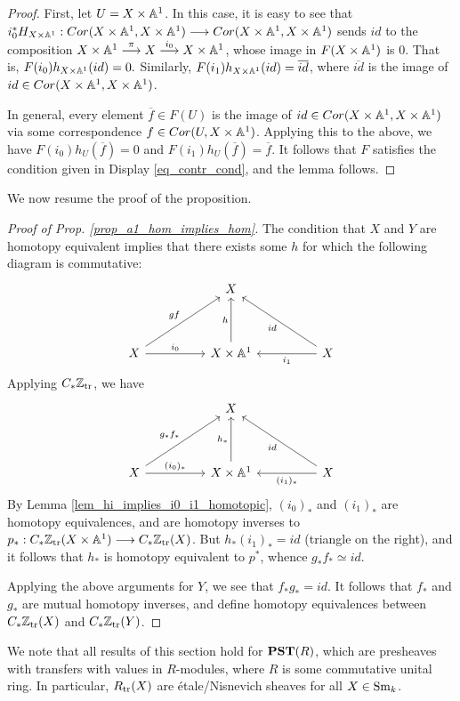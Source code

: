 \begin{proof}
First, let $U = X \times \mathbb{A}^1$. In this case, it is easy to see
that $i_0^* H_{X \times \mathbb{A}^1} : Cor(X \times \mathbb{A}^1, X \times \mathbb{A}^1) 
\longrightarrow Cor( X \times \mathbb{A}^1, X \times \mathbb{A}^1)$ sends $id$ to the 
composition $X \times \mathbb{A}^1 \stackrel{\pi}{\longrightarrow} X 
\stackrel{i_0}{\longrightarrow} X \times \mathbb{A}^1$, whose image in $F(X \times 
\mathbb{A}^1)$ is 0. That is, $F(i_0)h_{X \times \mathbb{A}^1}(id) = 0.$ 
Similarly, $F(i_1)h_{X \times \mathbb{A}^1}(id) = \overline{id}$, where
$\overline{id}$ is the image of $id \in Cor(X \times \mathbb{A}^1, X 
\times \mathbb{A}^1)$. 

In general, every element $\overline{f} \in F(U)$ is the image
of $id \in Cor(X \times \mathbb{A}^1, X \times \mathbb{A}^1)$ via some 
correspondence $f \in Cor(U, X \times \mathbb{A}^1)$. Applying this
to the above, we have $F(i_0)h_U(\overline{f}) = 0$ and $F(i_1)
h_U(\overline{f}) = \overline{f}$. It follows that $F$ satisfies
the condition given in Display \ref{eq_contr_cond}, and the lemma
follows.
\end{proof}

We now resume the proof of the proposition.

\begin{proof}[Proof of Prop. \ref{prop_a1_hom_implies_hom}]
The condition that $X$ and $Y$ are homotopy equivalent implies
that there exists some $h$ for which the following diagram is
commutative:
\[
\begin{tikzcd}[column sep=huge, row sep=huge]
{}& X \\
X \arrow{ru}{gf} \arrow{r}{i_0} &
X \times \A^1 \arrow{u}{h} &
X \arrow{l}{i_1} \arrow{lu}{id}
\end{tikzcd}
\]
Applying $C_{*} \mathbb{Z}_{\mathrm{tr}}$, we have
\[
\begin{tikzcd}[column sep=huge, row sep=huge]
{}& X \\
X \arrow{ru}{g_*f_*} \arrow{r}{(i_0)_*} &
X \times \A^1 \arrow{u}{h_*} &
X \arrow{l}{(i_1)_*} \arrow{lu}{id}
\end{tikzcd}
\]
By Lemma \ref{lem_hi_implies_i0_i1_homotopic}, $(i_0)_*$ and 
$(i_1)_*$ are homotopy equivalences, and are homotopy inverses to 
$p_* : C_{*} \mathbb{Z}_{\mathrm{tr}}(X \times \mathbb{A}^1) \longrightarrow C_{*} \mathbb{Z}_{\mathrm{tr}}(X)$. But 
$h_* (i_1)_* = id$ (triangle on the right), and it follows that 
$h_*$ is homotopy equivalent to $p^*$, whence $g_*f_* \simeq id$.

Applying the above arguments for $Y$, we see that $f_*g_* = id$.
It follows that $f_*$ and $g_*$ are mutual homotopy inverses, and
define homotopy equivalences between $C_{*} \mathbb{Z}_{\mathrm{tr}}(X)$ and $C_{*}
\mathbb{Z}_{\mathrm{tr}}(Y)$.
\end{proof}

\begin{rmk}
We note that all results of this section hold for $\mathbf{PST}(R)$, which
are presheaves with transfers with values in $R$-modules, where $R$
is some commutative unital ring. In particular, $R_{\mathrm{tr}}(X)$ are
\'etale/Nisnevich sheaves for all $X \in \mathrm{Sm}_{k}$.
\end{rmk}
